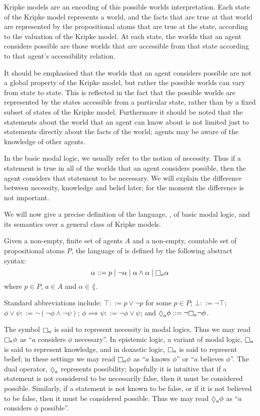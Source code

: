 Kripke models are an encoding of this possible worlds interpretation. Each state
of the Kripke model represents a world, and the facts that are true at that
world are represented by the propositional atoms that are true at the state,
according to the valuation of the Kripke model. At each state, the worlds that
an agent considers possible are those worlds that are accessible from that state
according to that agent's accessibility relation.

It should be emphasised that the worlds that an agent considers possible are not
a global property of the Kripke model, but rather the possible worlds can vary
from state to state. This is reflected in the fact that the possible worlds are
represented by the states accessible from a particular state, rather than by a
fixed subset of states of the Kripke model. Furthermore it should be noted that
the statements about the world that an agent can know about is not limited just
to statements directly about the facts of the world; agents may be aware of the
knowledge of other agents.

In the basic modal logic, we usually refer to the notion of necessity. Thus if a
statement is true in all of the worlds that an agent considers possible, then
the agent considers that statement to be necessary. We will explain the
difference between necessity, knowledge and belief later; for the moment the
difference is not important.

We will now give a precise definition of the language, \lang{}, of basic modal
logic, and its semantics over a general class of Kripke models.

\begin{definition}
Given a non-empty, finite set of agents $A$ and a non-empty, countable set of
propositional atoms $P$, the language of \lang{} is defined by the following
abstract syntax:
$$
\alpha ::=  p \bnfalt
            \neg \alpha \bnfalt
            \alpha \land \alpha \bnfalt
            \knows_a \alpha
$$
where $p \in P$, $a \in A$ and $\alpha \in \lang{}$.
\end{definition}

Standard abbreviations include:
$\top ::= p \lor \neg p$ for some $p \in P$;
$\bot ::= \neg \top$;
$\phi \lor \psi ::= \neg (\neg \phi \land \neg \psi)$;
$\phi \implies \psi ::= \neg \phi \lor \psi$;
and $\suspects_a \phi ::= \neg \knows_a \neg \phi$.

The symbol $\knows_a$ is said to represent necessity in modal logics. Thus we
may read $\knows_a \phi$ as ``$a$ considers $\phi$ necessary''. In epistemic
logic, a variant of modal logic, $\knows_a$ is said to represent knowledge, and
in doxastic logic, $\knows_a$ is said to represent belief; in these settings we
may read $\knows_a \phi$ as ``$a$ knows $\phi$'' or ``$a$ believes $\phi$''. The
dual operator, $\suspects_a$ represents possibility; hopefully it is intuitive
that if a statement is not considered to be necessarily false, then it must be
considered possible. Similarly, if a statement is not known to be false, or if
it is not believed to be false, then it must be considered possible.  Thus we
may read $\suspects_a \phi$ as ``$a$ considers $\phi$ possible''.

